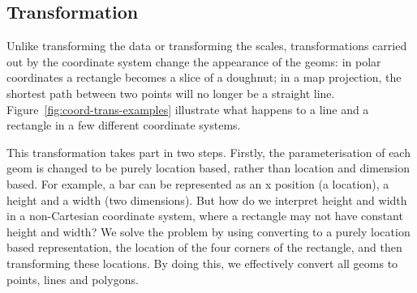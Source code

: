 \subsection{Transformation}
\label{sub:coord-transformation}

Unlike transforming the data or transforming the scales, transformations carried out by the coordinate system change the appearance of the geoms: in polar coordinates a rectangle becomes a slice of a doughnut; in a map projection, the shortest path between two points will no longer be a straight line.  Figure~\ref{fig:coord-trans-examples} illustrate what happens to a line and a rectangle in a few different coordinate systems.

% 


This transformation takes part in two steps.  Firstly, the parameterisation of each geom is changed to be purely location based, rather than location and dimension based.  For example, a bar can be represented as an x position (a location), a height and a width (two dimensions).  But how do we interpret height and width in a non-Cartesian coordinate system, where a rectangle may not have constant height and width?  We solve the problem by using converting to a purely location based representation, the location of the four corners of the rectangle, and then transforming these locations.  By doing this, we effectively convert all geoms to points, lines and polygons.  

